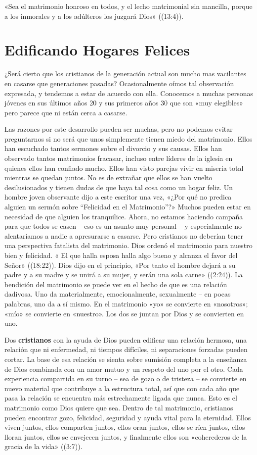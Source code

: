 \documentclass[12pt, twoside, openright]{book}
\begin{document}
«Sea el matrimonio honroso en todos, y el lecho matrimonial sin mancilla, porque a los inmorales y a los adúlteros los juzgará Dios» ((13:4)).

\section{Edificando Hogares Felices}
¿Será cierto que los cristianos de la generación actual son mucho mas vacilantes en casarse que generaciones pasadas? Ocasionalmente oímos tal observación expresada, y tendemos a estar de acuerdo con ella. Conocemos a muchas personas jóvenes en sus últimos años 20 y sus primeros años 30 que son «muy elegibles» pero parece que ni están cerca a casarse.

Las razones por este desarrollo pueden ser muchas, pero no podemos evitar preguntarnos si no será que unos simplemente tienen miedo del matrimonio. Ellos han escuchado tantos sermones sobre el divorcio y sus causas. Ellos han observado tantos matrimonios fracasar, incluso entre líderes de la iglesia en quienes ellos han confiado mucho. Ellos han visto parejas vivir en miseria total mientras se quedan juntos. No es de extrañar que ellos se han vuelto desilusionados y tienen dudas de que haya tal cosa como un hogar feliz. Un hombre joven observante dijo a este escritor una vez, «¿Por qué no predica alguien un sermón sobre “Felicidad en el Matrimonio”?» Muchos pueden estar en necesidad de que alguien los tranquilice. 
Ahora, no estamos haciendo campaña para que todos se casen – eso es un asunto muy personal – y especialmente no alentaríamos a nadie a apresurarse a casarse. Pero cristianos no deberían tener una perspectiva fatalista del matrimonio. Dios ordenó el matrimonio para nuestro bien y felicidad. « El que halla esposa halla algo bueno y alcanza el favor del Señor» ((18:22)). Dios dijo en el principio, «Por tanto el hombre dejará a su padre y a su madre y se unirá a su mujer, y serán una sola carne» ((2:24)). 
La bendición del matrimonio se puede ver en el hecho de que es una relación dadivosa. Uno da materialmente, emocionalmente, sexualmente – en pocas palabras, uno da a sí mismo. En el matrimonio «yo» se convierte en «nosotros»; «mío» se convierte en «nuestro». Los dos se juntan por Dios y se convierten en uno.

Dos \textbf{cristianos} con la ayuda de Dios pueden edificar una relación hermosa, una relación que ni enfermedad, ni tiempos difíciles, ni separaciones forzadas pueden cortar. La base de esa relación se sienta sobre sumisión completa a la enseñanza de Dios combinada con un amor mutuo y un respeto del uno por el otro. Cada experiencia compartida en su turno – sea de gozo o de tristeza – se convierte en nuevo material que contribuye a la estructura total, así que con cada año que pasa la relación se encuentra más estrechamente ligada que nunca. Esto es el matrimonio como Dios quiere que sea. Dentro de tal matrimonio, cristianos pueden encontrar gozo, felicidad, seguridad y ayuda vital para la eternidad. Ellos viven juntos, ellos comparten juntos, ellos oran juntos, ellos se ríen juntos, ellos lloran juntos, ellos se envejecen juntos, y finalmente ellos son «coherederos de la gracia de la vida» ((3:7)).
\end{document}
